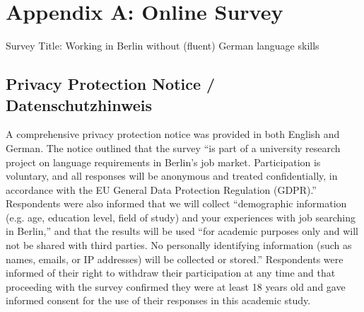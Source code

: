 \section{Appendix A: Online Survey}
\label{appendix:A}
\noindent Survey Title: Working in Berlin without (fluent) German language skills

\subsection*{Privacy Protection Notice / Datenschutzhinweis}

A comprehensive privacy protection notice was provided in both English and German. The notice outlined that the survey “is part of a university research project on language requirements in Berlin’s job market. Participation is voluntary, and all responses will be anonymous and treated confidentially, in accordance with the EU General Data Protection Regulation (GDPR).” Respondents were also informed that we will collect “demographic information (e.g. age, education level, field of study) and your experiences with job searching in Berlin,” and that the results will be used “for academic purposes only and will not be shared with third parties. No personally identifying information (such as names, emails, or IP addresses) will be collected or stored.” Respondents were informed of their right to withdraw their participation at any time and that proceeding with the survey confirmed they were at least 18 years old and gave informed consent for the use of their responses in this academic study.


